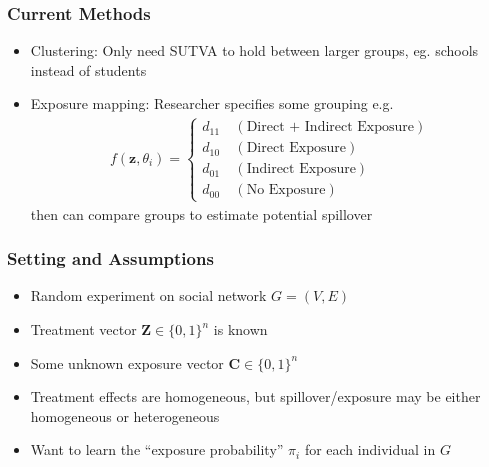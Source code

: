 \documentclass[
	11pt, %
]{beamer}
\begin{document}
\begin{frame}
	\frametitle{Current Methods}
	\begin{itemize}
		\setlength\itemsep{1em}
		\item Clustering: Only need SUTVA to hold between larger groups, eg. schools instead of students 
		\item Exposure mapping: Researcher specifies some grouping e.g. \begin{align*}
			f(\mathbf{z}, \theta_i) = \begin{cases}
				d_{11} \ &(\text{Direct + Indirect Exposure}) \\
				d_{10} \ &(\text{Direct Exposure})\\ 
				d_{01} \ &(\text{Indirect Exposure})\\
				d_{00} \ &(\text{No Exposure})
			\end{cases}
		\end{align*}
		then can compare groups to estimate potential spillover 
	\end{itemize}
\end{frame}

\begin{frame}
	\frametitle{Setting and Assumptions}
	\begin{itemize}
		\setlength\itemsep{1em}
		\item Random experiment on social network $G = (V, E)$
		\item Treatment vector $\mathbf{Z} \in \{0, 1\}^{n}$ is known 
		\item Some unknown exposure vector $\mathbf{C} \in \{0, 1\}^{n}$
		\item Treatment effects are homogeneous, but spillover/exposure may be either 
		homogeneous or heterogeneous
		\item Want to learn the ``exposure probability'' $\pi_i$ for each individual in $G$
	\end{itemize}
\end{frame}
\end{document}
